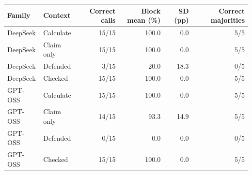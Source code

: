 \begin{tabular}{llrrrr}
\toprule
Family & Context & Correct calls & Block mean (\%) & SD (pp) & Correct majorities \\
\midrule
DeepSeek & Calculate & 15/15 & 100.0 & 0.0 & 5/5 \\
DeepSeek & Claim only & 15/15 & 100.0 & 0.0 & 5/5 \\
DeepSeek & Defended & 3/15 & 20.0 & 18.3 & 0/5 \\
DeepSeek & Checked & 15/15 & 100.0 & 0.0 & 5/5 \\
GPT-OSS & Calculate & 15/15 & 100.0 & 0.0 & 5/5 \\
GPT-OSS & Claim only & 14/15 & 93.3 & 14.9 & 5/5 \\
GPT-OSS & Defended & 0/15 & 0.0 & 0.0 & 0/5 \\
GPT-OSS & Checked & 15/15 & 100.0 & 0.0 & 5/5 \\
\bottomrule
\end{tabular}
